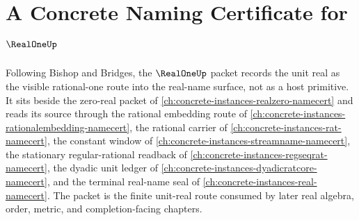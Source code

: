 \chapter{A Concrete Naming Certificate for $\RealOneUp$}
\label{ch:concrete-instances-real-one-namecert}

Following Bishop and Bridges, the $\RealOneUp$ packet records the unit real as the visible rational-one route into the real-name surface, not as a host primitive. It sits beside the zero-real packet of \autoref{ch:concrete-instances-realzero-namecert} and reads its source through the rational embedding route of \autoref{ch:concrete-instances-rationalembedding-namecert}, the rational carrier of \autoref{ch:concrete-instances-rat-namecert}, the constant window of \autoref{ch:concrete-instances-streamname-namecert}, the stationary regular-rational readback of \autoref{ch:concrete-instances-regseqrat-namecert}, the dyadic unit ledger of \autoref{ch:concrete-instances-dyadicratcore-namecert}, and the terminal real-name seal of \autoref{ch:concrete-instances-real-namecert}. The packet is the finite unit-real route consumed by later real algebra, order, metric, and completion-facing chapters.

